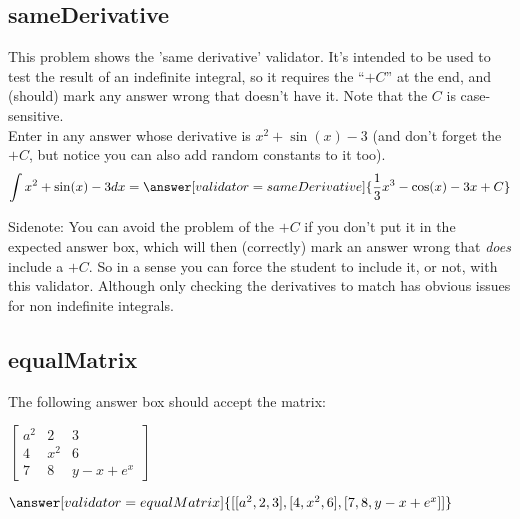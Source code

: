 \documentclass{ximera}
\begin{document}
    \subsection*{sameDerivative}

        \begin{problem}
            This problem shows the 'same derivative' validator. It's intended to be used to test the result of an indefinite integral, so it requires the ``$+C$'' at the end, and (should) mark any answer wrong that doesn't have it. Note that the $C$ is case-sensitive. \\
            
            Enter in any answer whose derivative is $x^2 + \sin(x) - 3$ (and don't forget the $+C$, but notice you can also add random constants to it too).
            \[
                \int x^2 + \sin(x) - 3 dx = \answer[validator=sameDerivative]{\frac{1}{3}x^3 - \cos(x) - 3x + C}
            \]
            
            Sidenote: You can avoid the problem of the $+C$ if you don't put it in the expected answer box, which will then (correctly) mark an answer wrong that \textit{does} include a $+C$. So in a sense you can force the student to include it, or not, with this validator. Although only checking the derivatives to match has obvious issues for non indefinite integrals.
        \end{problem}

    \subsection*{equalMatrix}
        \begin{problem}
            The following answer box should accept the matrix:
            
            $\left[\begin{matrix}
            a^2 & 2 & 3 \\
            4 & x^2 & 6 \\
            7 & 8 & y-x+e^x
            \end{matrix}\right]$
            
            $\answer[validator=equalMatrix]{[ [a^2,2,3], [4,x^2,6], [7,8,y-x+e^x] ]}$
        \end{problem}


\hrulefill
\end{document}
